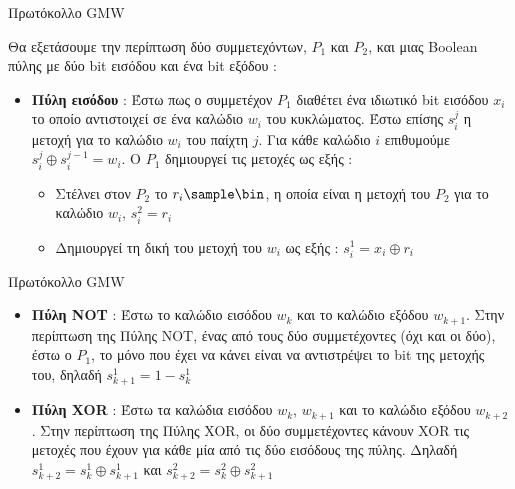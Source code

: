 \documentclass[10pt]{beamer}
\begin{document}
    \begin{frame}{Πρωτόκολλο GMW}
        \begin{block}{}
            Θα εξετάσουμε την περίπτωση δύο συμμετεχόντων, $P_1$ και $P_2$, και μιας Boolean πύλης με δύο bit εισόδου και ένα bit εξόδου :
            \begin{itemize}
                \item \textbf{Πύλη εισόδου} : Έστω πως ο συμμετέχον $P_1$ διαθέτει ένα ιδιωτικό bit εισόδου $x_i$ το οποίο αντιστοιχεί σε ένα καλώδιο $w_i$ του κυκλώματος. Έστω επίσης $s_i^j$ η μετοχή για το καλώδιο $w_i$ του παίχτη $j$. Για κάθε καλώδιο $i$ επιθυμούμε $s_i^j \oplus s_i^{j-1} = w_i$. Ο $P_1$ δημιουργεί τις μετοχές ως εξής :
                \begin{itemize}
                    \item Στέλνει στον $P_2$ το $r_i \sample \bin$, η οποία είναι η μετοχή του $P_2$ για το καλώδιο $w_i$, $s_i^2 = r_i$
                    \item Δημιουργεί τη δική του μετοχή του $w_i$ ως εξής : $s_i^1 = x_i \oplus r_i$
                \end{itemize}
            \end{itemize}
        \end{block}
    \end{frame}

    \begin{frame}{Πρωτόκολλο GMW}
        \begin{block}{}
            \begin{itemize}
            \item \textbf{Πύλη NOT} : Έστω το καλώδιο εισόδου $w_k$ και το καλώδιο εξόδου $w_{k+1}$. Στην περίπτωση της Πύλης NOT, ένας από τους δύο συμμετέχοντες (όχι και οι δύο), έστω ο $P_1$, το μόνο που έχει να κάνει είναι να αντιστρέψει το bit της μετοχής του, δηλαδή $s_{k+1}^1 = 1-s_k^1$
            \item \textbf{Πύλη XOR} : Έστω τα καλώδια εισόδου $w_k$, $w_{k+1}$ και το καλώδιο εξόδου $w_{k+2}$. Στην περίπτωση της Πύλης XOR, οι δύο συμμετέχοντες κάνουν XOR τις μετοχές που έχουν για κάθε μία από τις δύο εισόδους της πύλης. Δηλαδή $s_{k+2}^1 = s_{k}^1 \oplus s_{k+1}^1$ και $s_{k+2}^2 = s_k^2 \oplus s_{k+1}^2$
            \end{itemize}
        \end{block}
    \end{frame}
\end{document}
